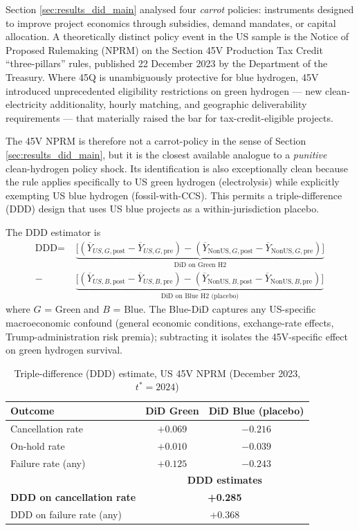 \label{sec:results_did_45v}

Section \ref{sec:results_did_main} analysed four \emph{carrot} policies: instruments designed to improve project economics through subsidies, demand mandates, or capital allocation. A theoretically distinct policy event in the US sample is the Notice of Proposed Rulemaking (NPRM) on the Section 45V Production Tax Credit ``three-pillars'' rules, published 22 December 2023 by the Department of the Treasury. Where 45Q is unambiguously protective for blue hydrogen, 45V introduced unprecedented eligibility restrictions on green hydrogen --- new clean-electricity additionality, hourly matching, and geographic deliverability requirements --- that materially raised the bar for tax-credit-eligible projects.

The 45V NPRM is therefore not a carrot-policy in the sense of Section \ref{sec:results_did_main}, but it is the closest available analogue to a \emph{punitive} clean-hydrogen policy shock. Its identification is also exceptionally clean because the rule applies specifically to US green hydrogen (electrolysis) while explicitly exempting US blue hydrogen (fossil-with-CCS). This permits a triple-difference (DDD) design that uses US blue projects as a within-jurisdiction placebo.

The DDD estimator is
\begin{align*}
\text{DDD} = \,\, & \underbrace{\big[(\overline{Y}_{US,G,\text{post}} - \overline{Y}_{US,G,\text{pre}}) - (\overline{Y}_{\text{NonUS},G,\text{post}} - \overline{Y}_{\text{NonUS},G,\text{pre}})\big]}_{\text{DiD on Green H2}} \\
- \,\, & \underbrace{\big[(\overline{Y}_{US,B,\text{post}} - \overline{Y}_{US,B,\text{pre}}) - (\overline{Y}_{\text{NonUS},B,\text{post}} - \overline{Y}_{\text{NonUS},B,\text{pre}})\big]}_{\text{DiD on Blue H2 (placebo)}}
\end{align*}
where $G$ = Green and $B$ = Blue. The Blue-DiD captures any US-specific macroeconomic confound (general economic conditions, exchange-rate effects, Trump-administration risk premia); subtracting it isolates the 45V-specific effect on green hydrogen survival.

\begin{table}[!htbp]
\centering
\caption{Triple-difference (DDD) estimate, US 45V NPRM (December 2023, $t^* = 2024$)}
\label{tab:ch6-45v-ddd}
\begin{tabular}{lcc}
\toprule
Outcome & DiD Green & DiD Blue (placebo) \\
\midrule
Cancellation rate & $+0.069$ & $-0.216$ \\
On-hold rate & $+0.010$ & $-0.039$ \\
Failure rate (any) & $+0.125$ & $-0.243$ \\
\midrule
& \multicolumn{2}{c}{\textbf{DDD estimates}} \\
\midrule
\textbf{DDD on cancellation rate} & \multicolumn{2}{c}{\textbf{+0.285}} \\
DDD on failure rate (any) & \multicolumn{2}{c}{+0.368} \\
\bottomrule
\end{tabular}
\end{table}

